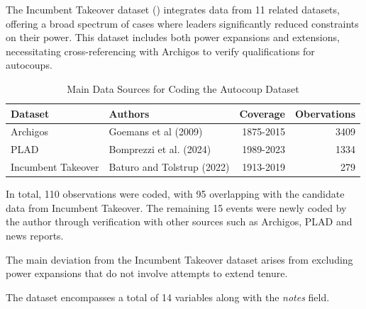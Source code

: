 \documentclass[
  12pt,
]{report}
\begin{document}
The Incumbent Takeover dataset () integrates data from 11 related datasets, offering a
broad spectrum of cases where leaders significantly reduced constraints
on their power. This dataset includes both power expansions and
extensions, necessitating cross-referencing with Archigos to verify
qualifications for autocoups.

\begin{longtable}[]{@{}llrr@{}}

\caption{\label{tbl-source}Main Data Sources for Coding the Autocoup
Dataset}

\tabularnewline

\toprule\noalign{}
Dataset & Authors & Coverage & Obervations \\
\midrule\noalign{}
\endhead
\bottomrule\noalign{}
\endlastfoot
Archigos & Goemans et al (2009) & 1875-2015 & 3409 \\
PLAD & Bomprezzi et al. (2024) & 1989-2023 & 1334 \\
Incumbent Takeover & Baturo and Tolstrup (2022) & 1913-2019 & 279 \\

\end{longtable}

In total, 110 observations were coded, with 95 overlapping with the
candidate data from Incumbent Takeover. The remaining 15 events were
newly coded by the author through verification with other sources such
as Archigos, PLAD and news reports.

The main deviation from the Incumbent Takeover dataset arises from
excluding power expansions that do not involve attempts to extend
tenure.

The dataset encompasses a total of 14 variables along with the
\emph{notes} field.
\end{document}
